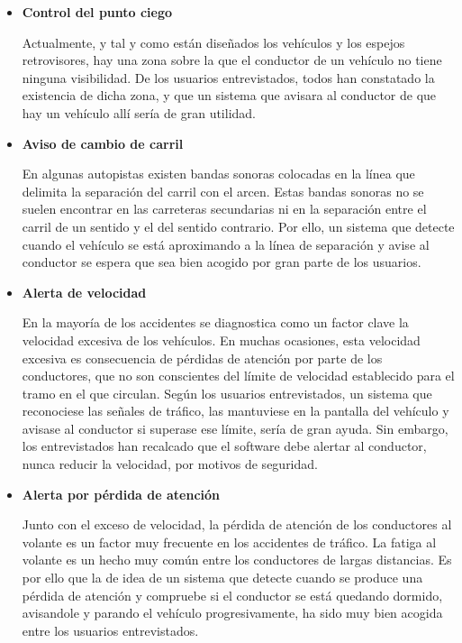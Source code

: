 \documentclass[10pt,a4paper,oldfontcommands]{dpds}
\begin{document}
\begin{itemize}[-]
\item \textbf{Control del punto ciego}
\par Actualmente, y tal y como están diseñados los vehículos y los espejos retrovisores, hay una zona sobre la que el conductor de un vehículo no tiene ninguna visibilidad. De los usuarios entrevistados, todos han constatado la existencia de dicha zona, y que un sistema que avisara al conductor de que hay un vehículo allí sería de gran utilidad.

\item \textbf{Aviso de cambio de carril}
\par En algunas autopistas existen bandas sonoras colocadas en la línea que delimita la separación del carril con el arcen. Estas bandas sonoras no se suelen encontrar en las carreteras secundarias ni en la separación entre el carril de un sentido y el del sentido contrario.  Por ello, un sistema que detecte cuando el vehículo se está aproximando a la línea de separación y avise al conductor se espera que sea bien acogido por gran parte de los usuarios.

\item \textbf{Alerta de velocidad}
\par En la mayoría de los accidentes se diagnostica como un factor clave la velocidad excesiva de los vehículos. En muchas ocasiones, esta velocidad excesiva es consecuencia de pérdidas de atención por parte de los conductores, que no son conscientes del límite de velocidad establecido para el tramo en el que circulan. Según los usuarios entrevistados, un sistema que reconociese las señales de tráfico, las mantuviese en la pantalla del vehículo y avisase al conductor si superase ese límite, sería de gran ayuda. Sin embargo, los entrevistados han recalcado que el software debe alertar al conductor, nunca reducir la velocidad, por motivos de seguridad.

\item \textbf{Alerta por pérdida de atención}
\par Junto con el exceso de velocidad, la pérdida de atención de los conductores al volante es un factor muy frecuente en los accidentes de tráfico. La fatiga al volante es un hecho muy común entre los conductores de largas distancias. Es por ello que la de idea de un sistema que detecte cuando se produce una pérdida de atención y compruebe si el conductor se está quedando dormido, avisandole y parando el vehículo progresivamente, ha sido muy bien acogida entre los usuarios entrevistados.


\end{itemize}
\end{document}
